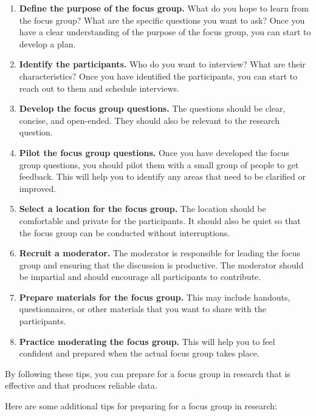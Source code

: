 \documentclass[
  b5paper]{book}
\begin{document}
\begin{enumerate}
\def\labelenumi{\arabic{enumi}.}
\item
  \textbf{Define the purpose of the focus group.} What do you hope to learn from the focus group? What are the specific questions you want to ask? Once you have a clear understanding of the purpose of the focus group, you can start to develop a plan.
\item
  \textbf{Identify the participants.} Who do you want to interview? What are their characteristics? Once you have identified the participants, you can start to reach out to them and schedule interviews.
\item
  \textbf{Develop the focus group questions.} The questions should be clear, concise, and open-ended. They should also be relevant to the research question.
\item
  \textbf{Pilot the focus group questions.} Once you have developed the focus group questions, you should pilot them with a small group of people to get feedback. This will help you to identify any areas that need to be clarified or improved.
\item
  \textbf{Select a location for the focus group.} The location should be comfortable and private for the participants. It should also be quiet so that the focus group can be conducted without interruptions.
\item
  \textbf{Recruit a moderator.} The moderator is responsible for leading the focus group and ensuring that the discussion is productive. The moderator should be impartial and should encourage all participants to contribute.
\item
  \textbf{Prepare materials for the focus group.} This may include handouts, questionnaires, or other materials that you want to share with the participants.
\item
  \textbf{Practice moderating the focus group.} This will help you to feel confident and prepared when the actual focus group takes place.
\end{enumerate}

By following these tips, you can prepare for a focus group in research that is effective and that produces reliable data.

Here are some additional tips for preparing for a focus group in research:
\end{document}
